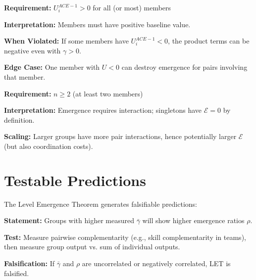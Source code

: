 \begin{tcolorbox}[colback=gray!5!white, colframe=gray!75!black,
    title=LET Condition 2: Positive Base Utilities]

\textbf{Requirement:} $U^{ACE-1}_i > 0$ for all (or most) members

\textbf{Interpretation:} Members must have positive baseline value.

\textbf{When Violated:} If some members have $U^{ACE-1}_i < 0$, the product
terms can be negative even with $\gamma > 0$.

\textbf{Edge Case:} One member with $U < 0$ can destroy emergence for
pairs involving that member.
\end{tcolorbox}

\begin{tcolorbox}[colback=gray!5!white, colframe=gray!75!black,
    title=LET Condition 3: Non-Degenerate Group]

\textbf{Requirement:} $n \geq 2$ (at least two members)

\textbf{Interpretation:} Emergence requires interaction; singletons have
$\mathcal{E} = 0$ by definition.

\textbf{Scaling:} Larger groups have more pair interactions, hence
potentially larger $\mathcal{E}$ (but also coordination costs).
\end{tcolorbox}


\section{Testable Predictions}
\label{sec:let-predictions}

The Level Emergence Theorem generates falsifiable predictions:

\begin{tcolorbox}[colback=green!5!white, colframe=green!75!black,
    title=Prediction LET-P1: Complementarity-Emergence Correlation]
\textbf{Statement:} Groups with higher measured $\bar{\gamma}$ will show
higher emergence ratios $\rho$.

\textbf{Test:} Measure pairwise complementarity (e.g., skill complementarity
in teams), then measure group output vs. sum of individual outputs.

\textbf{Falsification:} If $\bar{\gamma}$ and $\rho$ are uncorrelated or
negatively correlated, LET is falsified.
\end{tcolorbox}

